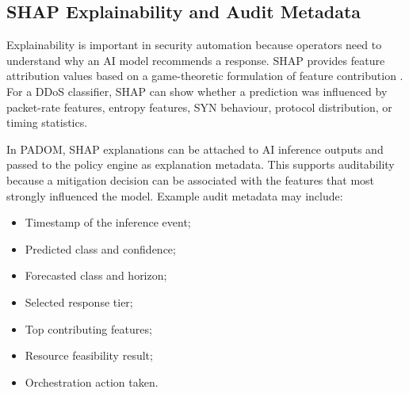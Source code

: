 \documentclass[12pt, a4paper, reqno, oneside]{book}
\newcommand{\padonap}{\textsc{PADOM}}
\begin{document}

\subsection{SHAP Explainability and Audit Metadata}
\label{sec:shap-bg}

Explainability is important in security automation because operators need to
understand why an AI model recommends a response. SHAP provides feature
attribution values based on a game-theoretic formulation of feature
contribution \cite{shap_lundberg2017}. For a DDoS classifier, SHAP can show
whether a prediction was influenced by packet-rate features, entropy features,
SYN behaviour, protocol distribution, or timing statistics.

In \padonap{}, SHAP explanations can be attached to AI inference outputs and
passed to the policy engine as explanation metadata. This supports
auditability because a mitigation decision can be associated with the features
that most strongly influenced the model. Example audit metadata may include:

\begin{itemize}
    \item Timestamp of the inference event;
    \item Predicted class and confidence;
    \item Forecasted class and horizon;
    \item Selected response tier;
    \item Top contributing features;
    \item Resource feasibility result;
    \item Orchestration action taken.
\end{itemize}
\end{document}
